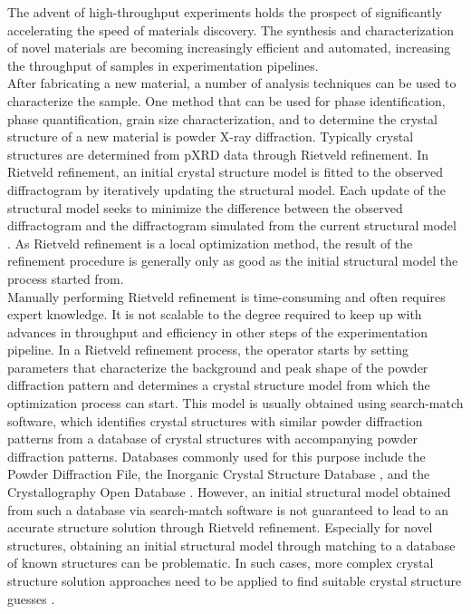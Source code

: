 The advent of high-throughput experiments holds the prospect of significantly accelerating the speed of materials discovery\cite{Liu2019}. The synthesis and characterization of novel materials are becoming increasingly efficient and automated, increasing the throughput of samples in experimentation pipelines\cite{MacLeod2019, Ludwig2019, Ozaki2020}. \\

After fabricating a new material, a number of analysis techniques can be used to characterize the sample. One method that can be used for phase identification, phase quantification, grain size characterization, and to determine the crystal structure of a new material is powder X-ray diffraction. Typically crystal structures are determined from pXRD data through Rietveld refinement. In Rietveld refinement, an initial crystal structure model is fitted to the observed diffractogram by iteratively updating the structural model. Each update of the structural model seeks to minimize the difference between the observed diffractogram and the diffractogram simulated from the current structural model \cite{Dinnebier2019, Cano2021}. As Rietveld refinement is a local optimization method, the result of the refinement procedure is generally only as good as the initial structural model the process started from. \\

Manually performing Rietveld refinement is time-consuming and often requires expert knowledge. It is not scalable to the degree required to keep up with advances in throughput and efficiency in other steps of the experimentation pipeline. In a Rietveld refinement process, the operator starts by setting parameters that characterize the background and peak shape of the powder diffraction pattern and determines a crystal structure model from which the optimization process can start. This model is usually obtained using search-match software, which identifies crystal structures with similar powder diffraction patterns from a database of crystal structures with accompanying powder diffraction patterns. Databases commonly used for this purpose include the Powder Diffraction File\cite{GatesRector2019}, the Inorganic Crystal Structure Database \cite{Belsky2002}, and the Crystallography Open Database \cite{Grazulis2009}. However, an initial structural model obtained from such a database via search-match software is not guaranteed to lead to an accurate structure solution through Rietveld refinement. Especially for novel structures, obtaining an initial structural model through matching to a database of known structures can be problematic. In such cases, more complex crystal structure solution approaches need to be applied to find suitable crystal structure guesses \cite{structure_solution_review}.\\

